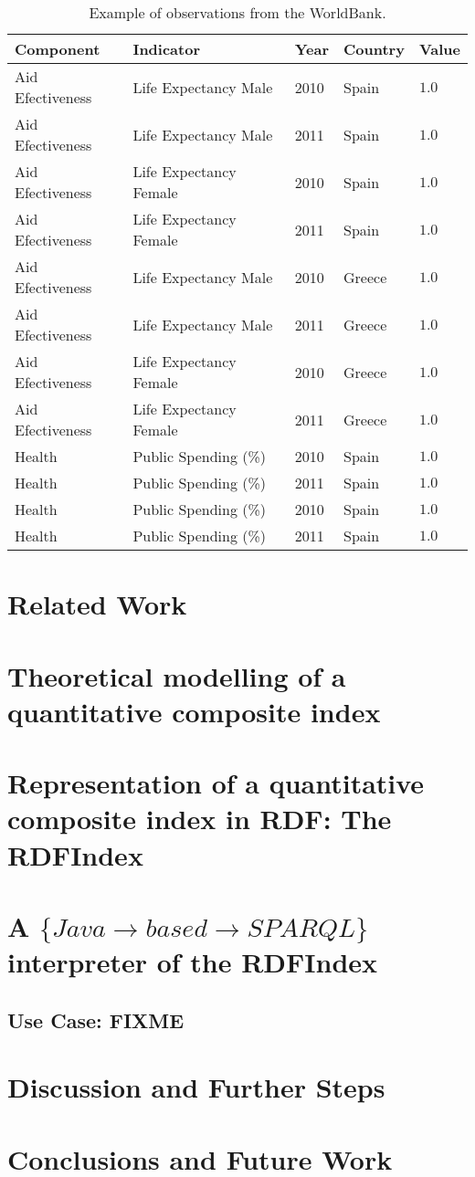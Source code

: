 \documentclass{llncs}
\begin{document}
\begin{table}[!htb]
\renewcommand{\arraystretch}{1.3}
\begin{center}
\begin{tabular}{|p{3cm}||p{3.5cm}|p{2.5cm}|p{2.5cm}|p{1cm}|}
\hline
  \textbf{Component} & \textbf{Indicator} & \textbf{Year} & \textbf{Country} & \textbf{Value}  \\  \hline
  Aid Efectiveness & Life Expectancy Male & 2010 & Spain & $1.0$ \\ \hline
  Aid Efectiveness & Life Expectancy Male & 2011 & Spain & $1.0$ \\ \hline
  Aid Efectiveness & Life Expectancy Female & 2010 & Spain & $1.0$ \\ \hline
  Aid Efectiveness & Life Expectancy Female & 2011 & Spain & $1.0$ \\ \hline
  Aid Efectiveness & Life Expectancy Male & 2010 & Greece & $1.0$ \\ \hline
  Aid Efectiveness & Life Expectancy Male & 2011 & Greece & $1.0$ \\ \hline
  Aid Efectiveness & Life Expectancy Female & 2010 & Greece & $1.0$ \\ \hline
  Aid Efectiveness & Life Expectancy Female & 2011 & Greece & $1.0$ \\ \hline
  Health & Public Spending (\%) & 2010 & Spain & $1.0$ \\ \hline
  Health & Public Spending (\%) & 2011 & Spain & $1.0$ \\ \hline
  Health & Public Spending (\%) & 2010 & Spain & $1.0$ \\ \hline
  Health & Public Spending (\%) & 2011 & Spain & $1.0$ \\ \hline
  \hline
  \end{tabular}
  \caption{Example of observations from the WorldBank.}
  \label{config-corfu}
  \end{center}
\end{table} 


\section{Related Work}
\section{Theoretical modelling of a quantitative composite index}
\section{Representation of a quantitative composite index in RDF: The RDFIndex}
\section{A $\{Java\rightarrow based \rightarrow SPARQL\}$  interpreter of the RDFIndex}
%
\subsection{Use Case: FIXME}
\section{Discussion and Further Steps}

\section{Conclusions and Future Work}
\end{document}
